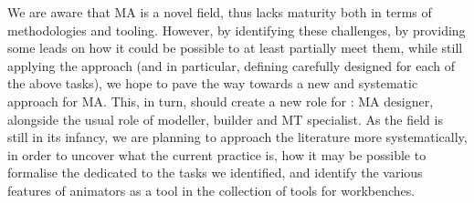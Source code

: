 We are aware that MA is a novel field, thus lacks maturity both in terms of methodologies
and tooling. However, by identifying these challenges, by providing some leads on
how it could be possible to at least partially meet them, while still applying
the \MDE approach (and in particular, defining carefully designed \DSLs for each
of the above tasks), we hope to pave the way towards a new and systematic approach
for MA. This, in turn, should create a new role for \MDE: MA designer, alongside
the usual role of modeller, \DSL builder and MT specialist. As the field is still
in its infancy, we are planning to approach the literature more systematically,
in order to uncover what the current practice is, how it may be possible to 
formalise the \DSLs dedicated to the tasks we identified, and identify the various
features of animators as a tool in the collection of tools for \MDE workbenches.